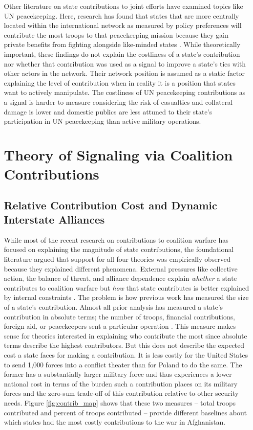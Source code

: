 \documentclass[12pt,letterpaper]{article}
\begin{document}
	Other literature on state contributions to joint efforts have examined topics like UN peacekeeping. Here, research has found that states that are more centrally located within the international network as measured by policy preferences will contribute the most troops to that peacekeeping mission because they gain private benefits from fighting alongside like-minded states \citep{dorussen_networkedinternationalpolitics_2016}. While theoretically important, these findings do not explain the costliness of a state's contribution nor whether that contribution was used as a signal to improve a state's ties with other actors in the network. Their network position is assumed as a static factor explaining the level of contribution when in reality it is a position that states want to actively manipulate. The costliness of UN peacekeeping contributions as a signal is harder to measure considering the risk of casualties and collateral damage is lower and domestic publics are less attuned to their state's participation in UN peacekeeping than active military operations.

\section{Theory of Signaling via Coalition Contributions}
	\subsection{Relative Contribution Cost and Dynamic Interstate Alliances}
		While most of the recent research on contributions to coalition warfare has focused on explaining the magnitude of state contributions, the foundational literature argued that support for all four theories was empirically observed because they explained different phenomena. External pressures like collective action, the balance of threat, and alliance dependence explain \textit{whether} a state contributes to coalition warfare but \textit{how} that state contributes is better explained by internal constraints \citep{bennett_burdensharingpersiangulf_1994}. The problem is how previous work has measured the size of a state's contribution. Almost all prior analysis has measured a state's contribution in absolute terms; the number of troops, financial contributions, foreign aid, or peacekeepers sent a particular operation \citep{mello_democraticparticipationarmed_2014, haesebrouck_explainingmemberstates_2016}. This measure makes sense for theories interested in explaining who contribute the most since absolute terms describe the highest contributors. But this does not describe the expected cost a state faces for making a contribution. It is less costly for the United States to send 1,000 forces into a conflict theater than for Poland to do the same. The former has a substantially larger military force and thus experiences a lower national cost in terms of the burden such a contribution places on its military forces and the zero-sum trade-off of this contribution relative to other security needs. Figure \ref{fig:contrib_map} shows that these two measures -- total troops contributed and percent of troops contributed -- provide different baselines about which states had the most costly contributions to the war in Afghanistan.
\end{document}
